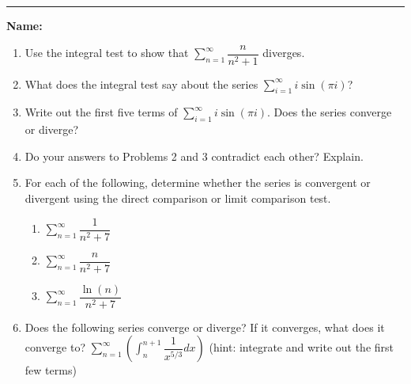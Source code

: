 \documentclass[11pt]{article}
\newcommand{\dsumn}{\displaystyle\sum_{n=1}^{\infty}}
\begin{document}
    \hrule
    \vspace{.5cm}
    \noindent\textbf{Name:} \underline{\qquad\qquad\qquad\qquad\qquad\qquad\qquad\qquad\qquad\qquad\qquad\qquad\qquad}

    \begin{enumerate}
        \item Use the integral test to show that $\displaystyle\sum_{n=1}^{\infty}\dfrac{n}{n^{2}+1}$ diverges.\vfill
        \item What does the integral test say about the series $\displaystyle\sum_{i=1}^{\infty}i\sin(\pi i)$?\vfill
        \newpage
        \item Write out the first five terms of $\displaystyle\sum_{i=1}^{\infty}i\sin(\pi i)$. Does the series converge or diverge?\vfill
        \item Do your answers to Problems 2 and 3 contradict each other? Explain.\vfill
        \newpage
        \item For each of the following, determine whether the series is convergent or divergent using the direct comparison or limit comparison test.
        \begin{enumerate}
            \item $\dsumn \dfrac{1}{n^{2}+7}$\vfill
            \item $\dsumn \dfrac{n}{n^{2}+7}$\vfill
            \item $\dsumn \dfrac{\ln(n)}{n^{2}+7}$\vfill
        \end{enumerate}
        \newpage
        \item Does the following series converge or diverge? If it converges, what does it converge to? $\dsumn \left(\displaystyle\int_{n}^{n+1}\dfrac{1}{x^{5/3}}dx\right)$ (hint: integrate and write out the first few terms)\vfill\vfill
    \end{enumerate}
\end{document}
